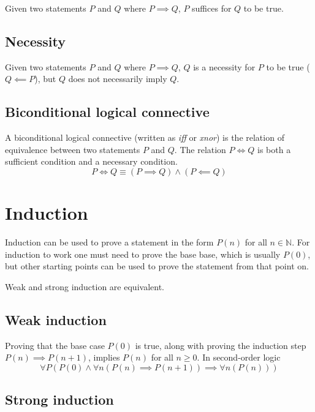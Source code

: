 \documentclass[a4paper]{article}
\begin{document}
Given two statements \(P\) and \(Q\) where \(P \implies Q\),
\(P\) suffices for \(Q\) to be true.

\subsection{Necessity}

Given two statements \(P\) and \(Q\) where \(P \implies Q\),
\(Q\) is a necessity for \(P\) to be true (\(Q \impliedby P\)), but
\(Q\) does not necessarily imply \(Q\).

\subsection{Biconditional logical connective}

A biconditional logical connective (written as \textit{iff} or \textit{xnor})
is the relation of equivalence
between two statements \(P\) and \(Q\).
The relation \(P \iff Q\) is both a sufficient condition and
a necessary condition.
\[
    P \iff Q
    \equiv
    (P \implies Q) \land (P \impliedby Q)
\]

\pagebreak

\section{Induction}

Induction can be used to prove a statement in the form \(P(n)\)
for all \(n \in \mathbb{N}\).
For induction to work one must need to prove the base base, which is usually \(P(0)\),
but other starting points can be used to prove the statement from that point on.

Weak and strong induction are equivalent.

\subsection{Weak induction}

Proving that the base case \(P(0)\) is true,
along with proving the induction step \(P(n) \implies P(n+1)\), implies \(P(n)\)
for all \(n \geq 0\). In second-order logic
\[
    \forall P \left(
        P(0) \land \forall n \left( P(n) \implies P(n+1) \right)
        \implies \forall n \left( P(n) \right)
    \right)
\]

\subsection{Strong induction}
\end{document}
